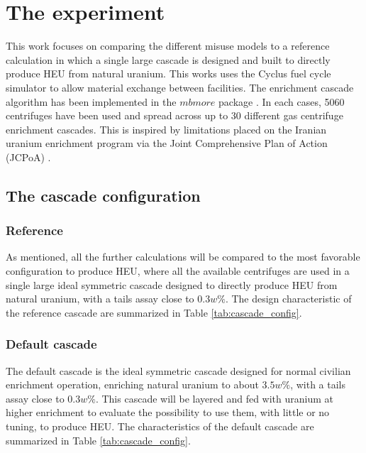 \section{The experiment}
This work focuses on comparing the different misuse models to a reference
calculation in which a single large cascade is designed and built to directly
produce \gls{HEU} from natural uranium.
This works uses the Cyclus fuel cycle simulator to allow material exchange
between facilities. The enrichment cascade algorithm has been implemented in
the $mbmore$ package \cite{mbmore.2018}.
In each cases, 5060 centrifuges have been used and spread across up to 30
different gas centrifuge enrichment cascades. This is inspired by limitations
placed on the Iranian uranium enrichment program via the Joint Comprehensive
Plan of Action (JCPoA) \cite{jcpoa}.


\subsection{The cascade configuration}

\subsubsection{Reference}

As mentioned, all the further calculations will be compared to the most
favorable configuration to produce \gls{HEU}, where all the available
centrifuges are used in a single large ideal symmetric cascade designed to
directly produce \gls{HEU} from natural uranium, with a tails assay close to
$0.3w\%$. The design characteristic of the reference cascade are summarized in
Table \ref{tab:cascade_config}.

\subsubsection{Default cascade}

The default cascade is the ideal symmetric cascade designed for normal civilian
enrichment operation, enriching natural uranium to about $3.5w\%$, with a tails
assay close to $0.3w\%$. This cascade will be layered and fed with uranium at
higher enrichment to evaluate the possibility to use them, with little or no
tuning, to produce \gls{HEU}. The characteristics of the default cascade are
summarized in Table \ref{tab:cascade_config}.

